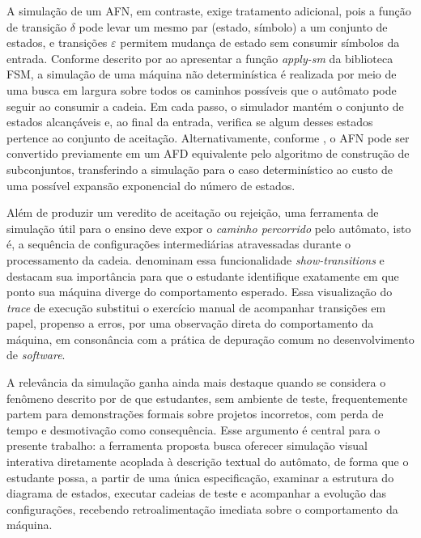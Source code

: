 \documentclass[
    12pt
    ,oneside
    ,a4paper
    ,chapter=TITLE
    ,section=TITLE
    ,sumario=abnt-6027-2012]{abntex2}
\begin{document}
A simulação de um AFN, em contraste, exige tratamento adicional, pois a função de transição
$\delta$ pode levar um mesmo par (estado, símbolo) a um conjunto de estados, e transições
$\varepsilon$ permitem mudança de estado sem consumir símbolos da entrada. Conforme descrito
por  ao apresentar a função \textit{apply-sm} da biblioteca FSM, a
simulação de uma máquina não determinística é realizada por meio de uma busca em largura sobre
todos os caminhos possíveis que o autômato pode seguir ao consumir a cadeia. Em cada passo, o
simulador mantém o conjunto de estados alcançáveis e, ao final da entrada, verifica se algum
desses estados pertence ao conjunto de aceitação. Alternativamente, conforme ,
o AFN pode ser convertido previamente em um AFD equivalente pelo algoritmo de construção de
subconjuntos, transferindo a simulação para o caso determinístico ao custo de uma possível
expansão exponencial do número de estados.

Além de produzir um veredito de aceitação ou rejeição, uma ferramenta de simulação útil para o
ensino deve expor o \textit{caminho percorrido} pelo autômato, isto é, a sequência de
configurações intermediárias atravessadas durante o processamento da cadeia. 
denominam essa funcionalidade \textit{show-transitions} e destacam sua importância para que o
estudante identifique exatamente em que ponto sua máquina diverge do comportamento esperado.
Essa visualização do \textit{trace} de execução substitui o exercício manual de acompanhar transições
em papel, propenso a erros, por uma observação direta do comportamento da máquina, em
consonância com a prática de depuração comum no desenvolvimento de \textit{software}.

A relevância da simulação ganha ainda mais destaque quando se considera o fenômeno descrito por
 de que estudantes, sem ambiente de teste, frequentemente partem para
demonstrações formais sobre projetos incorretos, com perda de tempo e desmotivação como
consequência. Esse argumento é central para o presente trabalho: a ferramenta proposta busca
oferecer simulação visual interativa diretamente acoplada à descrição textual do autômato, de
forma que o estudante possa, a partir de uma única especificação, examinar a estrutura do
diagrama de estados, executar cadeias de teste e acompanhar a evolução das configurações,
recebendo retroalimentação imediata sobre o comportamento da máquina.
\end{document}
